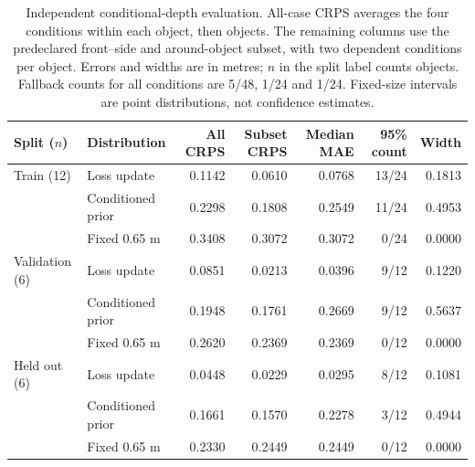 \begin{table}[tbp]
\centering\small
\setlength{\tabcolsep}{3.5pt}
\caption{Independent conditional-depth evaluation. All-case CRPS averages the four conditions within each object, then objects. The remaining columns use the predeclared front--side and around-object subset, with two dependent conditions per object. Errors and widths are in metres; $n$ in the split label counts objects. Fallback counts for all conditions are 5/48, 1/24 and 1/24. Fixed-size intervals are point distributions, not confidence estimates.}
\label{tab:depth-calibration-aggregate}
\begin{tabular}{llrrrrr}
\toprule
Split ($n$) & Distribution & All CRPS & Subset CRPS & Median MAE & 95\% count & Width \\
\midrule
Train (12) & Loss update & 0.1142 & 0.0610 & 0.0768 & 13/24 & 0.1813 \\
 & Conditioned prior & 0.2298 & 0.1808 & 0.2549 & 11/24 & 0.4953 \\
 & Fixed 0.65 m & 0.3408 & 0.3072 & 0.3072 & 0/24 & 0.0000 \\
\midrule
Validation (6) & Loss update & 0.0851 & 0.0213 & 0.0396 & 9/12 & 0.1220 \\
 & Conditioned prior & 0.1948 & 0.1761 & 0.2669 & 9/12 & 0.5637 \\
 & Fixed 0.65 m & 0.2620 & 0.2369 & 0.2369 & 0/12 & 0.0000 \\
\midrule
Held out (6) & Loss update & 0.0448 & 0.0229 & 0.0295 & 8/12 & 0.1081 \\
 & Conditioned prior & 0.1661 & 0.1570 & 0.2278 & 3/12 & 0.4944 \\
 & Fixed 0.65 m & 0.2330 & 0.2449 & 0.2449 & 0/12 & 0.0000 \\
\bottomrule
\end{tabular}
\end{table}
